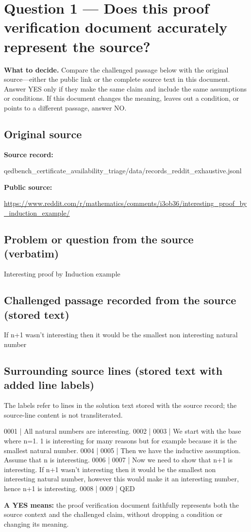 \documentclass[11pt]{article}
\begin{document}
\section*{Question 1 --- Does this proof verification document accurately represent the source?}
\textbf{What to decide.} Compare the challenged passage below with the original source---either the public link or the complete source text in this document. Answer YES only if they make the same claim and include the same assumptions or conditions. If this document changes the meaning, leaves out a condition, or points to a different passage, answer NO.
\subsection*{Original source}
\textbf{Source record:}
\begin{Vsrc}
qedbench_certificate_availability_triage/data/records_reddit_exhaustive.jsonl
\end{Vsrc}
\textbf{Public source:}\par
\url{https://www.reddit.com/r/mathematics/comments/i3ob36/interesting_proof_by_induction_example/}\par
\subsection*{Problem or question from the source (verbatim)}
\begin{Vsrc}
Interesting proof by Induction example
\end{Vsrc}
\subsection*{Challenged passage recorded from the source (stored text)}
\begin{Vsrc}
If n+1 wasn’t interesting then it would be the smallest non interesting natural number
\end{Vsrc}
\subsection*{Surrounding source lines (stored text with added line labels)}
The labels refer to lines in the solution text stored with the source record; the source-line content is not transliterated.
\begin{Vsrc}
0001 | All natural numbers are interesting.
0002 | 
0003 | We start with the base where n=1. 1 is interesting for many reasons but for example because it is the smallest natural number.
0004 | 
0005 | Then we have the inductive assumption. Assume that n is interesting.
0006 | 
0007 | Now we need to show that n+1 is interesting. If n+1 wasn’t interesting then it would be the smallest non interesting natural number, however this would make it an interesting number, hence n+1 is interesting.
0008 | 
0009 | QED
\end{Vsrc}
\textbf{A YES means:} the proof verification document faithfully represents both the source context and the challenged claim, without dropping a condition or changing its meaning.
\end{document}
